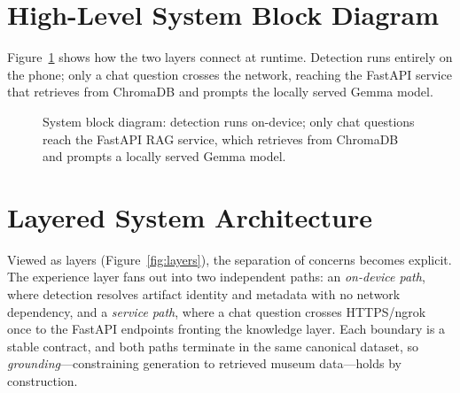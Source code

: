 \section{High-Level System Block Diagram}

Figure~\ref{fig:block} shows how the two layers connect at runtime. Detection runs
entirely on the phone; only a chat question crosses the network, reaching the FastAPI
service that retrieves from ChromaDB and prompts the locally served Gemma model.

\begin{figure}[htbp]
\centering
{}
\caption{System block diagram: detection runs on-device; only chat questions reach the
FastAPI RAG service, which retrieves from ChromaDB and prompts a locally served Gemma
model.}
\label{fig:block}
\end{figure}

\FloatBarrier

\section{Layered System Architecture}

Viewed as layers (Figure~\ref{fig:layers}), the separation of concerns becomes
explicit. The experience layer fans out into two independent paths: an
\emph{on-device path}, where detection resolves artifact identity and metadata
with no network dependency, and a \emph{service path}, where a chat question
crosses HTTPS/ngrok once to the FastAPI endpoints fronting the knowledge layer.
Each boundary is a stable contract, and both paths terminate in the same
canonical dataset, so \emph{grounding}---constraining generation to retrieved
museum data---holds by construction.

